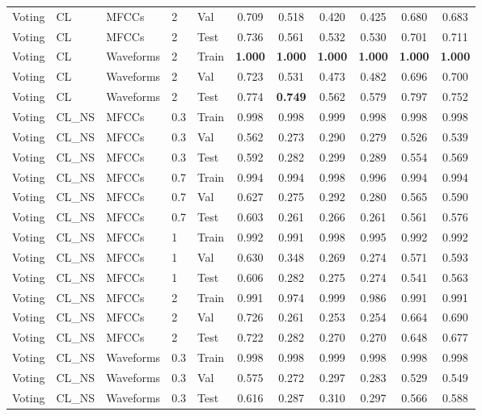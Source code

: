 \begin{landscape}
\begin{longtable}{|l|l|l|l|l|c|c|c|c|c|c|}
Voting & CL & MFCCs & 2 & Val & 0.709 & 0.518 & 0.420 & 0.425 & 0.680 & 0.683 \\
Voting & CL & MFCCs & 2 & Test & 0.736 & 0.561 & 0.532 & 0.530 & 0.701 & 0.711 \\
Voting & CL & Waveforms & 2 & Train & \textbf{1.000} & \textbf{1.000} & \textbf{1.000} & \textbf{1.000} & \textbf{1.000} & \textbf{1.000} \\
Voting & CL & Waveforms & 2 & Val & 0.723 & 0.531 & 0.473 & 0.482 & 0.696 & 0.700 \\
Voting & CL & Waveforms & 2 & Test & 0.774 & \textbf{0.749} & 0.562 & 0.579 & 0.797 & 0.752 \\
Voting & CL\_NS & MFCCs & 0.3 & Train & 0.998 & 0.998 & 0.999 & 0.998 & 0.998 & 0.998 \\
Voting & CL\_NS & MFCCs & 0.3 & Val & 0.562 & 0.273 & 0.290 & 0.279 & 0.526 & 0.539 \\
Voting & CL\_NS & MFCCs & 0.3 & Test & 0.592 & 0.282 & 0.299 & 0.289 & 0.554 & 0.569 \\
Voting & CL\_NS & MFCCs & 0.7 & Train & 0.994 & 0.994 & 0.998 & 0.996 & 0.994 & 0.994 \\
Voting & CL\_NS & MFCCs & 0.7 & Val & 0.627 & 0.275 & 0.292 & 0.280 & 0.565 & 0.590 \\
Voting & CL\_NS & MFCCs & 0.7 & Test & 0.603 & 0.261 & 0.266 & 0.261 & 0.561 & 0.576 \\
Voting & CL\_NS & MFCCs & 1 & Train & 0.992 & 0.991 & 0.998 & 0.995 & 0.992 & 0.992 \\
Voting & CL\_NS & MFCCs & 1 & Val & 0.630 & 0.348 & 0.269 & 0.274 & 0.571 & 0.593 \\
Voting & CL\_NS & MFCCs & 1 & Test & 0.606 & 0.282 & 0.275 & 0.274 & 0.541 & 0.563 \\
Voting & CL\_NS & MFCCs & 2 & Train & 0.991 & 0.974 & 0.999 & 0.986 & 0.991 & 0.991 \\
Voting & CL\_NS & MFCCs & 2 & Val & 0.726 & 0.261 & 0.253 & 0.254 & 0.664 & 0.690 \\
Voting & CL\_NS & MFCCs & 2 & Test & 0.722 & 0.282 & 0.270 & 0.270 & 0.648 & 0.677 \\
Voting & CL\_NS & Waveforms & 0.3 & Train & 0.998 & 0.998 & 0.999 & 0.998 & 0.998 & 0.998 \\
Voting & CL\_NS & Waveforms & 0.3 & Val & 0.575 & 0.272 & 0.297 & 0.283 & 0.529 & 0.549 \\
Voting & CL\_NS & Waveforms & 0.3 & Test & 0.616 & 0.287 & 0.310 & 0.297 & 0.566 & 0.588 \\

\end{longtable}
\end{landscape}
